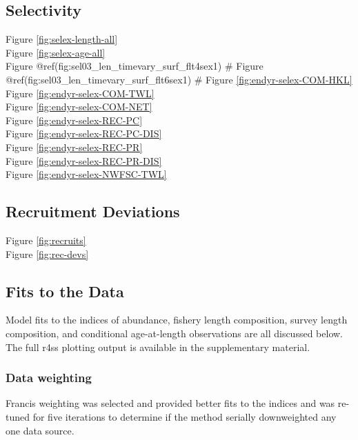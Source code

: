 \documentclass[
  english,
  a4paper,
]{article}
\begin{document}
\vspace{0.5cm}

\hypertarget{selectivity}{%
\subsection{Selectivity}\label{selectivity}}

Figure \ref{fig:selex-length-all}\\
Figure \ref{fig:selex-age-all}\\
Figure @ref(fig:sel03\_len\_timevary\_surf\_flt4sex1) \#
Figure @ref(fig:sel03\_len\_timevary\_surf\_flt6sex1) \#
Figure \ref{fig:endyr-selex-COM-HKL}\\
Figure \ref{fig:endyr-selex-COM-TWL}\\
Figure \ref{fig:endyr-selex-COM-NET}\\
Figure \ref{fig:endyr-selex-REC-PC}\\
Figure \ref{fig:endyr-selex-REC-PC-DIS}\\
Figure \ref{fig:endyr-selex-REC-PR}\\
Figure \ref{fig:endyr-selex-REC-PR-DIS}\\
Figure \ref{fig:endyr-selex-NWFSC-TWL}

\hypertarget{recruitment-deviations}{%
\subsection{Recruitment Deviations}\label{recruitment-deviations}}

Figure \ref{fig:recruits}\\
Figure \ref{fig:rec-devs}

\hypertarget{fits-to-the-data}{%
\subsection{Fits to the Data}\label{fits-to-the-data}}

Model fits to the indices of abundance, fishery length composition, survey length
composition, and conditional age-at-length observations are all discussed below.
The full r4ss plotting output is available in the supplementary material.

\hypertarget{data-weighting-1}{%
\subsubsection{Data weighting}\label{data-weighting-1}}

Francis weighting was selected and provided better fits to the indices
and was re-tuned for five iterations to determine if the method serially downweighted any
one data source.
\end{document}
